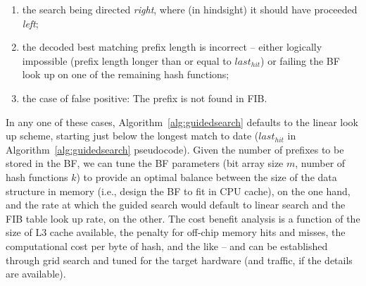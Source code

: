 \documentclass[conference,compsoc]{IEEEtran}
\begin{document}
\begin{enumerate}
  \item the search being directed \emph{right}, where 
    (in hindsight) it should have proceeded \emph{left};
  \item the decoded best matching prefix length is incorrect -- either 
    logically impossible (prefix length longer than
    or equal to $last_{hit}$) or failing the BF look up on one of the
    remaining hash functions;
  \item the case of false positive: The prefix is not found in
    FIB.
\end{enumerate}

In any one of these cases, Algorithm~\ref{alg:guidedsearch} defaults to the linear look up
scheme, starting
just below the longest match to date ($last_{hit}$ in Algorithm~\ref{alg:guidedsearch} pseudocode).
Given the number of prefixes to be stored in the BF, we can tune the BF 
parameters (bit array size $m$, number of hash functions $k$) to provide
an optimal balance between the size of the data structure in memory (i.e.,
design the BF to fit in CPU cache), on the one hand, and the rate at which
the guided search would default to linear search and the FIB table look up 
rate, on the other. The cost benefit analysis is a
function of the size of L3 cache available, the penalty for off-chip memory 
hits and misses, the computational cost per byte of hash, and the like --
and can be established through grid search and tuned for the target 
hardware (and traffic, if the details are available).
\end{document}
